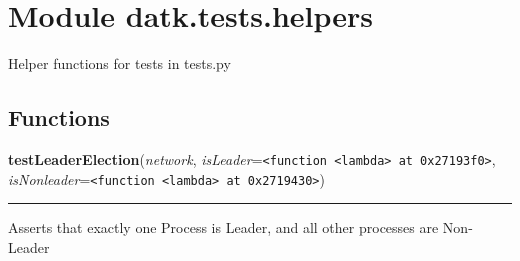 %
%
%


\section{Module datk.tests.helpers}

    \label{datk:tests:helpers}
Helper functions for tests in tests.py



  \subsection{Functions}

    \label{datk:tests:helpers:testLeaderElection}

    \vspace{0.5ex}

\hspace{.8\funcindent}\begin{boxedminipage}{\funcwidth}

    \raggedright \textbf{testLeaderElection}(\textit{network}, \textit{isLeader}={\tt {\textless}function {\textless}lambda{\textgreater} at 0x27193f0{\textgreater}}, \textit{isNonleader}={\tt {\textless}function {\textless}lambda{\textgreater} at 0x2719430{\textgreater}})

    \vspace{-1.5ex}

    \rule{\textwidth}{0.5\fboxrule}
\setlength{\parskip}{2ex}
    Asserts that exactly one Process is Leader, and all other processes are
    Non-Leader

\setlength{\parskip}{1ex}
    \end{boxedminipage}


